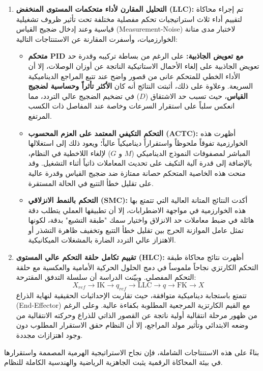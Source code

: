 \begin{enumerate}
    \item \textbf{التحليل المقارن لأداء متحكمات المستوى المنخفض (LLC):}
    تم إجراء محاكاة لتقييم أداء ثلاث استراتيجيات تحكم مفصلية مختلفة تحت تأثير ظروف تشغيلية قياسية وعند إدخال ضجيج القياس (Measurement-Noise) لاختبار مدى متانة الخوارزميات، وأسفرت المقارنة عن الاستنتاجات التالية:
    \begin{itemize}
        \item \textbf{متحكم PID مع تعويض الجاذبية:} على الرغم من بساطة تركيبه وقدرة حد تعويض الجاذبية على إلغاء الأحمال الاستاتيكية الناتجة عن أوزان الوصلات، إلا أن الأداء الخطي للمتحكم عانى من قصور واضح عند تتبع المراجع الديناميكية السريعة. وعلاوة على ذلك، أثبتت النتائج أنه كان \textbf{الأكثر تأثراً وحساسية لضجيج القياس}، حيث تسبب حد الاشتقاق ($D$) في تضخيم الضجيج عالي التردد، مما انعكس سلباً على استقرار السرعات وخاصة عند المفاصل ذات الكسب المرتفع.
        \item \textbf{التحكم التكيفي المعتمد على العزم المحسوب (ACTC):} أظهرت هذه الخوارزمية تفوقاً ملحوظاً واستقراراً ديناميكياً عالياً؛ ويعود ذلك إلى استغلالها المباشر لمصفوفات النموذج الديناميكي ($M$ و $G$) لإلغاء اللاخطية في النظام، بالإضافة إلى قدرة آلية التكيف  على تحديث المعاملات ذاتياً أثناء التشغيل. وقد منحت هذه الخاصية المتحكم حصانة ممتازة ضد ضجيج القياس وقدرة عالية على تقليل خطأ التتبع في الحالة المستقرة.
        \item \textbf{التحكم بالنمط الانزلاقي (SMC):} أكدت النتائج المتانة العالية  التي تتمتع بها هذه الخوارزمية في مواجهة الاضطرابات، إلا أن تطبيقها العملي يتطلب دقة هائلة في ضبط معاملات حد الانزلاق واختيار سمك "طبقة التشبع"  بدقة، لكونها تمثل عامل الموازنة الحرج بين تقليل خطأ التتبع وتخفيف ظاهرة التشذر أو الاهتزاز عالي التردد  الضارة بالمشغلات الميكانيكية.
    \end{itemize}

    \item \textbf{تقييم تكامل حلقة التحكم عالي المستوى (HLC):}
    أظهرت نتائج محاكاة طبقة التحكم الكارتزي نجاحاً ملموساً في دمج الحلول الحركية الأمامية والعكسية مع حلقة التحكم المفصلي. وبيّنت الدراسة أن سلسلة التدفق المقترحة:
    \[
    X_{ref} \rightarrow \text{IK} \rightarrow q_{ref} \rightarrow \text{LLC} \rightarrow q \rightarrow \text{FK} \rightarrow X
    \]
    تتمتع باستجابة ديناميكية متوافقة، حيث تقاربت الإحداثيات الحقيقية لنهاية الذراع (End-Effector) مع القيم الكارتزية المرجعية المطلوبة بكفاءة عالية. وعلى الرغم من ظهور مرحلة انتقالية أولية  ناتجة عن القصور الذاتي للذراع وحركته الانتقالية من وضعه الابتدائي وتأثير مولد المراجع، إلا أن النظام حقق الاستقرار المطلوب  دون وجود اهتزازات مجددة.
\end{enumerate}

بناءً على هذه الاستنتاجات الشاملة، فإن نجاح الاستراتيجية الهرمية المصممة واستقرارها في بيئة المحاكاة الرقمية يثبت الجاهزية الرياضية والهندسية الكاملة للنظام.  